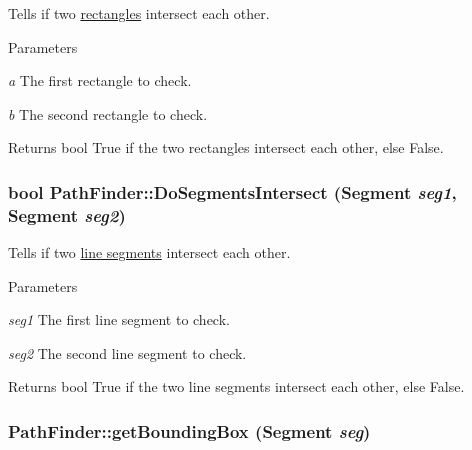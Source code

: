 Tells if two \hyperlink{structPathFinder_1_1Rectangle}{rectangles} intersect each other. 


\begin{DoxyParams}{Parameters}
\item[{\em a}]The first rectangle to check. \item[{\em b}]The second rectangle to check. \end{DoxyParams}
\begin{DoxyReturn}{Returns}
bool True if the two rectangles intersect each other, else False. 
\end{DoxyReturn}
\hypertarget{classPathFinder_a87a4f6d236e4b386e8b727e465f802be}{
\subsubsection[{DoSegmentsIntersect}]{\setlength{\rightskip}{0pt plus 5cm}bool PathFinder::DoSegmentsIntersect ({\bf Segment} {\em seg1}, \/  {\bf Segment} {\em seg2})}}
\label{classPathFinder_a87a4f6d236e4b386e8b727e465f802be}


Tells if two \hyperlink{structPathFinder_1_1Segment}{line segments} intersect each other. 


\begin{DoxyParams}{Parameters}
\item[{\em seg1}]The first line segment to check. \item[{\em seg2}]The second line segment to check. \end{DoxyParams}
\begin{DoxyReturn}{Returns}
bool True if the two line segments intersect each other, else False. 
\end{DoxyReturn}
\hypertarget{classPathFinder_aff7a6dc34e3075686230ac4c64632c38}{
\subsubsection[{getBoundingBox}]{ PathFinder::getBoundingBox ({\bf Segment} {\em seg})}}
\label{classPathFinder_aff7a6dc34e3075686230ac4c64632c38}


